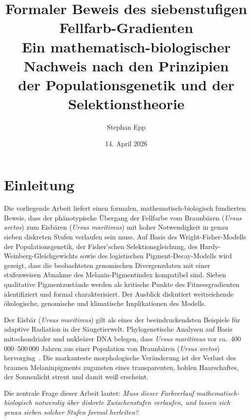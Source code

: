 ﻿\documentclass[12pt,a4paper]{article}
\title{%
  \LARGE{\bfseries Formaler Beweis des siebenstufigen Fellfarb-Gradienten}\\[0.0em]
  \large Ein mathematisch-biologischer Nachweis nach den Prinzipien\\
  der Populationsgenetik und der Selektionstheorie
}
\author{Stephan Epp}
\date{14. April 2026}
\theoremstyle{remark}
\begin{document}
\maketitle
\tableofcontents
\newpage

\section{Einleitung}
Die vorliegende Arbeit liefert einen formalen, mathematisch-biologisch fundierten
Beweis, dass der ph\"{a}notypische \"{U}bergang der Fellfarbe vom Braunb\"{a}ren
(\textit{Ursus arctos}) zum Eisb\"{a}ren (\textit{Ursus maritimus}) mit hoher
Notwendigkeit in genau sieben diskreten Stufen verlaufen sein muss.
Auf Basis des Wright-Fisher-Modells der Populationsgenetik, der Fisher'schen
Selektionsgleichung, des Hardy-Weinberg-Gleichgewichts sowie des logistischen
Pigment-Decay-Modells wird gezeigt, dass die beobachteten genomischen
Divergenzdaten mit einer stufenweisen Abnahme des Melanin-Pigmentindex
kompatibel sind. Sieben qualitative Pigmentzust\"{a}nde werden als kritische
Punkte des Fitnessgradienten identifiziert und formal charakterisiert.
Der Ausblick diskutiert weitreichende \"{o}kologische, genomische und
klimatische Implikationen des Modells.

Der Eisb\"{a}r (\textit{Ursus maritimus}) gilt als eines der beeindruckendsten
Beispiele f\"{u}r adaptive Radiation in der S\"{a}ugetierwelt. Phylogenetische
Analysen auf Basis mitochondrialer und nukle\"{a}rer DNA belegen, dass
\textit{Ursus maritimus} vor ca.~400\,000--500\,000 Jahren aus einer Population
von Braunb\"{a}ren (\textit{Ursus arctos}) hervorging~\cite{hailer2012,miller2012}.
Die markanteste morphologische Ver\"{a}nderung ist der Verlust des braunen
Melaninpigments zugunsten eines transparenten, hohlen Haarschaftes, der
Sonnenlicht streut und damit wei\ss{} erscheint.

Die zentrale Frage dieser Arbeit lautet: \emph{Muss dieser Farbverlauf
mathematisch-biologisch notwendig \"{u}ber diskrete Zwischenstufen verlaufen,
und lassen sich genau sieben solcher Stufen formal herleiten?}
\end{document}
